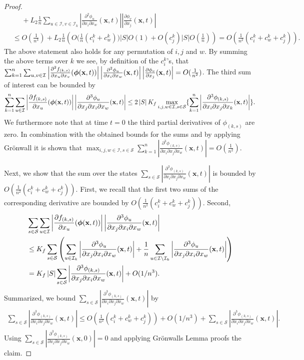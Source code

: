 \documentclass[acmsmall]{acmart}
\newcommand\bx{\mathbf{x}}
\newcommand\bphi{\text{\boldmath$\phi$}}
\newcommand\calI{\mathcal{I}}
\newcommand\calS{\mathcal{S}}
\newcommand\abs[1]{\left|#1\right|}         %
\newcommand{\ddd}[4]{ \frac{\partial^3 #1 }{ \partial x_{#2} \partial x_{#3} \partial x_{#4} }}
\newcommand{\dd}[3]{ \frac{\partial^2 #1 }{ \partial x_{#2} \partial x_{#3}}}
\begin{document}
\begin{proof}
\begin{align*}
& \phantom{\leq} + L_{2}\frac{1}{n} \sum_{u\in \calI,v \in \calI_k} \abs{\dd{\phi_{u}}{i}{w}(\bx,t)} \abs{\frac{\partial \phi_{v}}{\partial x_j}(\bx,t)} \\
& \leq O(\frac{1}{n^3}) + L_{2}\frac{1}{n}\left( O\bigl(\frac{1}{n}(c^k_{i} + c^k_{w})\bigr)\abs{S}O(1) + O(c^k_{j})\abs{S}O(\frac{1}{n}) \right)
 = O\left(\frac{1}{n^2}(c^k_{i} + c^k_{w} + c^k_{j})\right).
\end{align*}
The above statement also holds for any permutation of $i,j$ and $w$. By summing the above terms over $k$ we see, by definition of the $c^k_{i}$'s, that $\sum_{k=1}^n\sum_{u,v \in \calI} \abs{\dd{f_{(k,s)}}{u}{v}(\bphi (\bx,t))} \abs{\dd{\phi_{u}}{i}{w}(\bx,t)} \abs{\frac{\partial \phi_{v}}{\partial x_j}(\bx,t)} = O(\frac{1}{n^2})$. The third sum of interest can be bounded by
\begin{align*}
 \sum_{k=1}^{n} \sum_{u \in \calI} \abs{\frac{\partial f_{(k,s)}}{\partial x_u}(\bphi (\bx,t))} \abs{\ddd{\phi_{u}}{j}{i}{w}(\bx,t)} \leq 2 \abs{S} K_f \max_{i,j,w\in \calI,s\in \calS} \{ \sum_{k=1}^{n} \abs{\ddd{\phi_{(k,s)}}{i}{j}{k}(\bx,t)} \}.
\end{align*}
We furthermore note that at time $t{=}0$ the third partial derivatives of $\phi_{(k,s)}$ are zero. In combination with the obtained bounds for the sums and by applying Grönwall it is shown that $\max_{i,j,w \in \calI,s \in \calS} \sum_{k=1}^{n} \abs{\ddd{\phi_{(k,s)}}{i}{j}{w}(\bx,t)} = O(\frac{1}{n^2})$. 

Next, we show that the sum over the states $\sum_{s\in \calS} \abs{\ddd{\phi_{(k,s)}}{i}{j}{w}(\bx,t)}$ is bounded by $O\left( \frac{1}{n^2}(c^k_{i} + c^k_{w} + c^k_{j}) \right)$. First, we recall that the first two sums of the corresponding derivative are bounded by $O\left( \frac{1}{n^2}(c^k_{i} + c^k_{w} + c^k_{j}) \right)$. Second, 
\begin{align*}
& \sum_{s\in \calS} \sum_{u \in \calI} \abs{\frac{\partial f_{(k,s)}}{\partial x_u}(\bphi (\bx,t))} \abs{\ddd{\phi_{u}}{j}{i}{w}(\bx,t)} \\
& \leq  K_f \sum_{s\in \calS} \left( \sum_{u \in \calI_k} \abs{\ddd{\phi_{u}}{j}{i}{w}(\bx,t)} + \frac{1}{n} \sum_{u \in \calI \setminus \calI_k}  \abs{\ddd{\phi_{u}}{j}{i}{w}(\bx,t)} \right) \\
&  = K_f\abs{S} \sum_{s\in \calS} \abs{\ddd{\phi_{(k,s)}}{j}{i}{w}(\bx,t)} +  O(1/n^3) .
\end{align*}
Summarized, we bound $\sum_{s\in \calS} \abs{\ddd{\phi_{(k,s)}}{i}{j}{w}(\bx,t)}$ by 
\begin{align*}
\sum_{s\in \calS} \abs{\ddd{\phi_{(k,s)}}{i}{j}{w}(\bx,t)} \leq O\left( \frac{1}{n^2}(c^k_{i} + c^k_{w} + c^k_{j}) \right) + O(1/n^3) + \sum_{s\in \calS} \abs{\ddd{\phi_{(k,s)}}{i}{j}{w}(\bx,t)}.
\end{align*}
Using $\sum_{s\in \calS} \abs{\ddd{\phi_{(k,s)}}{i}{j}{w}(\bx,0)} = 0$ and applying Grönwalls Lemma proofs the claim. 


\end{proof}
\end{document}
